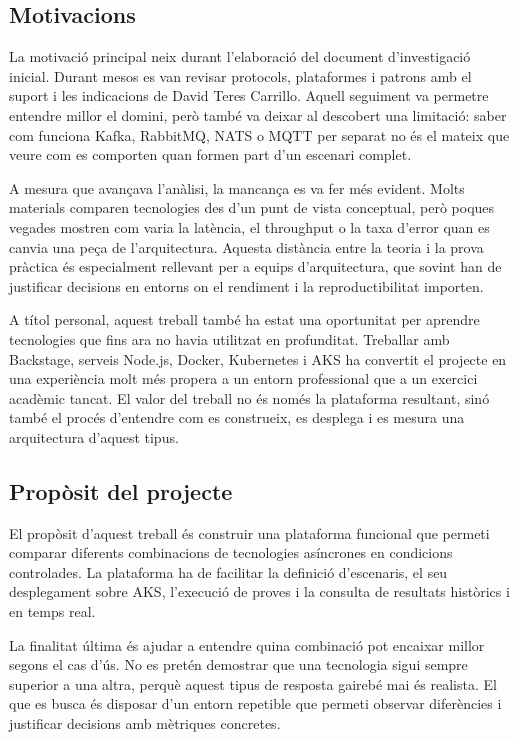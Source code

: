 \documentclass[11pt,a4paper]{article}
\begin{document}
\subsection{Motivacions}
La motivaci\'o principal neix durant l'elaboraci\'o del document d'investigaci\'o inicial. Durant mesos es van revisar protocols, plataformes i patrons amb el suport i les indicacions de David Teres Carrillo. Aquell seguiment va permetre entendre millor el domini, per\`o tamb\'e va deixar al descobert una limitaci\'o: saber com funciona Kafka, RabbitMQ, NATS o MQTT per separat no \'es el mateix que veure com es comporten quan formen part d'un escenari complet.

A mesura que avan\c{c}ava l'an\`alisi, la mancan\c{c}a es va fer m\'es evident. Molts materials comparen tecnologies des d'un punt de vista conceptual, per\`o poques vegades mostren com varia la lat\`encia, el throughput o la taxa d'error quan es canvia una pe\c{c}a de l'arquitectura. Aquesta dist\`ancia entre la teoria i la prova pr\`actica \'es especialment rellevant per a equips d'arquitectura, que sovint han de justificar decisions en entorns on el rendiment i la reproductibilitat importen.

A t\'itol personal, aquest treball tamb\'e ha estat una oportunitat per aprendre tecnologies que fins ara no havia utilitzat en profunditat. Treballar amb Backstage, serveis Node.js, Docker, Kubernetes i AKS ha convertit el projecte en una experi\`encia molt m\'es propera a un entorn professional que a un exercici acad\`emic tancat. El valor del treball no \'es nom\'es la plataforma resultant, sin\'o tamb\'e el proc\'es d'entendre com es construeix, es desplega i es mesura una arquitectura d'aquest tipus.

\subsection{Prop\`osit del projecte}
El prop\`osit d'aquest treball \'es construir una plataforma funcional que permeti comparar diferents combinacions de tecnologies as\'incrones en condicions controlades. La plataforma ha de facilitar la definici\'o d'escenaris, el seu desplegament sobre AKS, l'execuci\'o de proves i la consulta de resultats hist\`orics i en temps real.

La finalitat \'ultima \'es ajudar a entendre quina combinaci\'o pot encaixar millor segons el cas d'\'us. No es pret\'en demostrar que una tecnologia sigui sempre superior a una altra, perqu\`e aquest tipus de resposta gaireb\'e mai \'es realista. El que es busca \'es disposar d'un entorn repetible que permeti observar difer\`encies i justificar decisions amb m\`etriques concretes.
\end{document}

